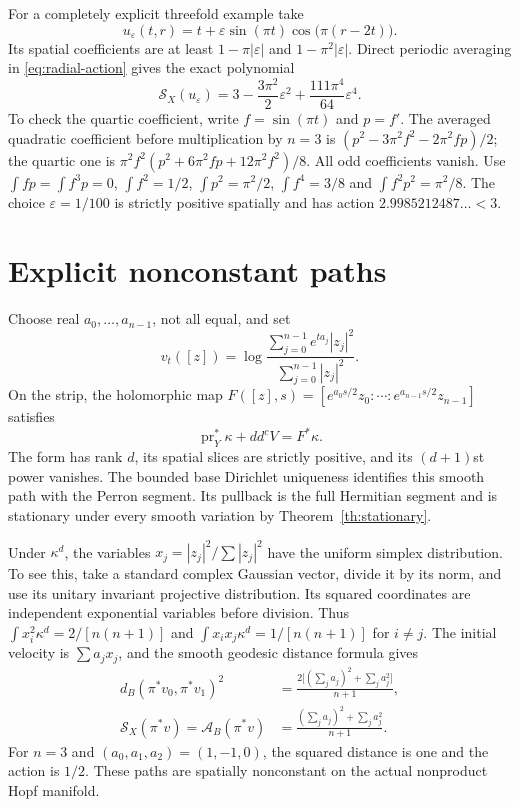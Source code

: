 \documentclass[11pt]{article}
\newcommand{\ddc}{dd^c}
\theoremstyle{remark}\newtheorem{remark}[theorem]{Remark}
\begin{document}
For a completely explicit threefold example take
\[
 u_\varepsilon(t,r)=t+\varepsilon\sin(\pi t)
                         \cos\bigl(\pi(r-2t)\bigr).
\]
Its spatial coefficients are at least $1-\pi|\varepsilon|$ and
$1-\pi^2|\varepsilon|$. Direct periodic averaging in
\eqref{eq:radial-action} gives the exact polynomial
\begin{equation}\label{eq:saddle-polynomial}
 \mathcal S_X(u_\varepsilon)
    =3-\frac{3\pi^2}{2}\varepsilon^2
                     +\frac{111\pi^4}{64}\varepsilon^4.
\end{equation}
To check the quartic coefficient, write $f=\sin(\pi t)$ and $p=f'$.
The averaged quadratic coefficient before multiplication by $n=3$ is
$(p^2-3\pi^2f^2-2\pi^2fp)/2$; the quartic one is
$\pi^2f^2(p^2+6\pi^2fp+12\pi^2f^2)/8$.
All odd coefficients vanish. Use
$\int fp=\int f^3p=0$, $\int f^2=1/2$, $\int p^2=\pi^2/2$,
$\int f^4=3/8$ and $\int f^2p^2=\pi^2/8$.
The choice $\varepsilon=1/100$ is strictly positive spatially and
has action $2.9985212487\ldots<3$.

\section{Explicit nonconstant paths}
Choose real $a_0,\ldots,a_{n-1}$, not all equal, and set
\[
 v_t([z])=\log\frac{\sum_{j=0}^{n-1}e^{ta_j}|z_j|^2}
                        {\sum_{j=0}^{n-1}|z_j|^2}.
\]
On the strip, the holomorphic map
$F([z],s)=[e^{a_0s/2}z_0:\cdots:e^{a_{n-1}s/2}z_{n-1}]$
satisfies
\[
 \operatorname{pr}_Y^*\kappa+\ddc V=F^*\kappa.
\]
The form has rank $d$, its spatial slices are strictly positive, and
its $(d+1)$st power vanishes. The bounded base Dirichlet uniqueness
\cite[Section 2.2, (16)--(17)]{Darvas} identifies this smooth path
with the Perron segment. Its pullback is the full Hermitian segment
and is stationary under every smooth variation by
Theorem~\ref{th:stationary}.

Under $\kappa^d$, the variables
$x_j=|z_j|^2/\sum|z_j|^2$ have the uniform simplex distribution.
To see this, take a standard complex Gaussian vector, divide it by its
norm, and use its unitary invariant projective distribution. Its squared
coordinates are independent exponential variables before division.
Thus $\int x_i^2\kappa^d=2/[n(n+1)]$ and
$\int x_ix_j\kappa^d=1/[n(n+1)]$ for $i\ne j$.
The initial velocity is $\sum a_jx_j$, and the smooth geodesic
distance formula gives
\begin{equation}\label{eq:explicit-action}
 \begin{split}
 d_B(\pi^*v_0,\pi^*v_1)^2
      &=\frac{2\bigl[(\sum_ja_j)^2+\sum_ja_j^2\bigr]}{n+1},\\
 \mathcal S_X(\pi^*v)=\mathcal A_B(\pi^*v)
      &=\frac{(\sum_ja_j)^2+\sum_ja_j^2}{n+1}.
 \end{split}
\end{equation}
For $n=3$ and $(a_0,a_1,a_2)=(1,-1,0)$, the squared distance is one
and the action is $1/2$. These paths are spatially nonconstant on the
actual nonproduct Hopf manifold.
\end{document}
